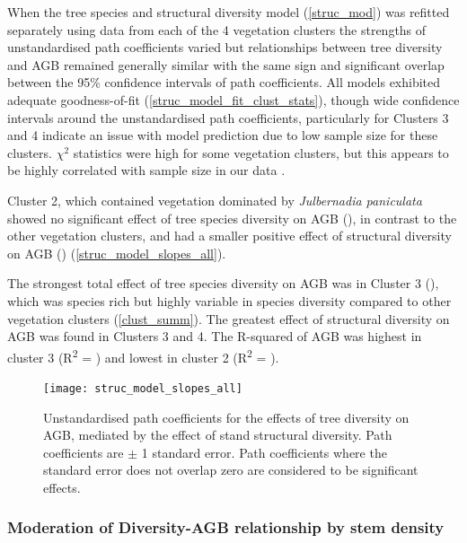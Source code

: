 \documentclass[11pt,a4paper]{article}
\begin{document}
When the tree species and structural diversity model (\autoref{struc_mod}) was refitted separately using data from each of the 4 vegetation clusters the strengths of unstandardised path coefficients varied but relationships between tree diversity and AGB remained generally similar with the same sign and significant overlap between the 95\% confidence intervals of path coefficients. All models exhibited adequate goodness-of-fit (\autoref{struc_model_fit_clust_stats}), though wide confidence intervals around the unstandardised path coefficients, particularly for Clusters 3 and 4 indicate an issue with model prediction due to low sample size for these clusters. $\chi^{2}$ statistics were high for some vegetation clusters, but this appears to be highly correlated with sample size in our data \citep{}.

Cluster 2, which contained vegetation dominated by \textit{Julbernadia paniculata} showed no significant effect of tree species diversity on AGB (\strucbsb{}), in contrast to the other vegetation clusters, and had a smaller positive effect of structural diversity on AGB (\strucbhb{}) (\autoref{struc_model_slopes_all}).

The strongest total effect of tree species diversity on AGB was in Cluster 3 (\struccsb{}), which was species rich but highly variable in species diversity compared to other vegetation clusters (\autoref{clust_summ}). The greatest effect of structural diversity on AGB was found in Clusters 3 and 4. The R-squared of AGB was highest in cluster 3 (R\textsuperscript{2} = \struccrsq{}) and lowest in cluster 2 (R\textsuperscript{2} = \strucbrsq{}).

\begin{figure}[H]
\centering
	\texttt{[image: struc\_model\_slopes\_all]}
	\caption{Unstandardised path coefficients for the effects of tree diversity on AGB, mediated by the effect of stand structural diversity. Path coefficients are $\pm$ 1 standard error. Path coefficients where the standard error does not overlap zero are considered to be significant effects.}
	\label{struc_model_slopes_all}
\end{figure}




\subsubsection{Moderation of Diversity-AGB relationship by stem density}
\end{document}
